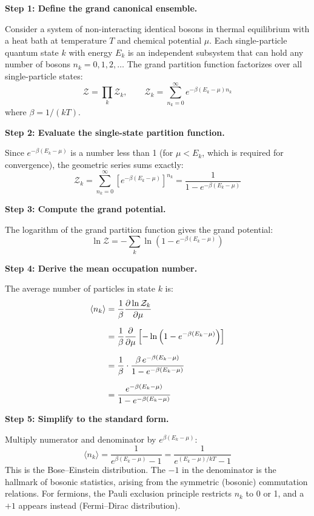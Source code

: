 \textbf{Step 1: Define the grand canonical ensemble.}

Consider a system of non-interacting identical bosons in thermal equilibrium with a heat bath at temperature $T$ and chemical potential $\mu$. Each single-particle quantum state $k$ with energy $E_k$ is an independent subsystem that can hold any number of bosons $n_k = 0, 1, 2, \ldots$ The grand partition function factorizes over all single-particle states:
\begin{equation}
\mathcal{Z} = \prod_k \mathcal{Z}_k, \qquad \mathcal{Z}_k = \sum_{n_k=0}^{\infty} e^{-\beta(E_k - \mu)n_k}
\end{equation}
where $\beta = 1/(kT)$.

\textbf{Step 2: Evaluate the single-state partition function.}

Since $e^{-\beta(E_k - \mu)}$ is a number less than 1 (for $\mu < E_k$, which is required for convergence), the geometric series sums exactly:
\begin{equation}
\mathcal{Z}_k = \sum_{n_k=0}^{\infty} \left[e^{-\beta(E_k - \mu)}\right]^{n_k} = \frac{1}{1 - e^{-\beta(E_k - \mu)}}
\end{equation}

\textbf{Step 3: Compute the grand potential.}

The logarithm of the grand partition function gives the grand potential:
\begin{equation}
\ln \mathcal{Z} = -\sum_k \ln\left(1 - e^{-\beta(E_k - \mu)}\right)
\end{equation}

\textbf{Step 4: Derive the mean occupation number.}

The average number of particles in state $k$ is:
\begin{align}
\langle n_k \rangle &= \frac{1}{\beta} \frac{\partial \ln \mathcal{Z}_k}{\partial \mu} \notag \\[6pt]
&= \frac{1}{\beta} \frac{\partial}{\partial \mu} \left[-\ln\left(1 - e^{-\beta(E_k - \mu)}\right)\right] \notag \\[6pt]
&= \frac{1}{\beta} \cdot \frac{\beta \, e^{-\beta(E_k - \mu)}}{1 - e^{-\beta(E_k - \mu)}} \notag \\[6pt]
&= \frac{e^{-\beta(E_k - \mu)}}{1 - e^{-\beta(E_k - \mu)}}
\end{align}

\textbf{Step 5: Simplify to the standard form.}

Multiply numerator and denominator by $e^{\beta(E_k - \mu)}$:
\begin{equation}
\boxed{\langle n_k \rangle = \frac{1}{e^{\beta(E_k - \mu)} - 1} = \frac{1}{e^{(E_k - \mu)/kT} - 1}}
\end{equation}
This is the Bose--Einstein distribution. The $-1$ in the denominator is the hallmark of bosonic statistics, arising from the symmetric (bosonic) commutation relations. For fermions, the Pauli exclusion principle restricts $n_k$ to 0 or 1, and a $+1$ appears instead (Fermi--Dirac distribution).

